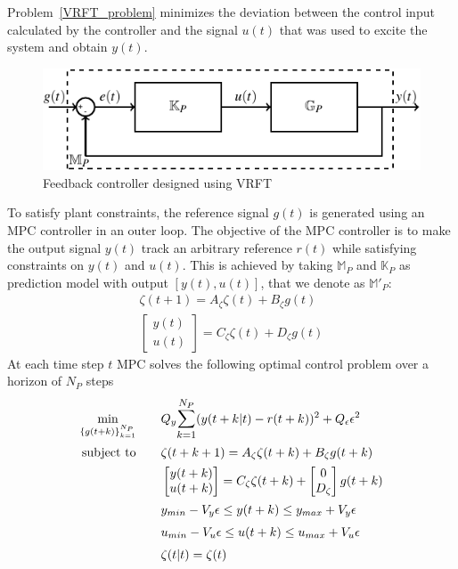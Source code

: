 \documentclass[letterpaper, 10 pt, conference]{ieeeconf}  %
\begin{document}
Problem~\eqref{VRFT_problem} minimizes the deviation between the control input calculated by the controller and the signal $u(t)$ that was used to excite the system and obtain $y(t)$.
\begin{figure}[t]
		\hspace{20pt}
	\includegraphics[scale=0.8]{KpGp.pdf}
	\caption{Feedback controller designed using VRFT}
\end{figure}
To satisfy plant constraints, the reference signal $g(t)$ is generated using an MPC controller in an outer loop. The objective of the MPC controller is to make the output signal $y(t)$ track an arbitrary reference $r(t)$ while satisfying constraints on $y(t)$ and $u(t)$. This is achieved by taking $\mathbb{M}_P$ and $\mathbb{K}_P$ as prediction model with 
output $[y(t),u(t)]$, that we denote as $\mathbb{M}'_P$:
	\begin{equation*}
	\begin{matrix}
	\zeta(t+1) = A_\zeta\zeta(t) + B_\zeta g(t)\\
	\begin{bmatrix}y(t)\\u(t)\end{bmatrix} = C_\zeta\zeta(t) + D_\zeta g(t)
	\end{matrix}
    \label{eq:cl-model}
	\end{equation*}
At each time step $t$ MPC solves the following optimal control problem over a horizon of $N_P$ steps
	\begin{equation}
	\small
	\begin{aligned}
	 \underset{\{g(t+k)\}_{k=1}^{N_P}}{\text{min}}
	& \hspace{20pt} Q_y\mathlarger{\sum\limits_{k=1}^{N_P}}(y(t+k|t)-r(t+k))^2 + Q_{\epsilon}\epsilon^2 \\
	 \text{subject to}
	&   \hspace{20pt}
	\zeta(t+k+1) = A_\zeta\zeta(t+k) + B_\zeta g(t+k)\\
	& \hspace{20pt} \begin{bmatrix}y(t+k)\\u(t+k)\end{bmatrix} = C_\zeta\zeta(t+k) +  \begin{bmatrix}0\\D_\zeta\end{bmatrix}g(t+k)\\
	& \hspace{20pt}  y_{min}-V_y\epsilon \leq y(t+k) \leq  y_{max}+V_y\epsilon \\
	& \hspace{20pt}  u_{min}-V_u\epsilon \leq u(t+k) \leq u_{max}+V_u\epsilon \\
	& \hspace{20pt}  \zeta(t|t) = \zeta(t)
	\end{aligned}
	\label{MPC}
	\end{equation}
\end{document}
